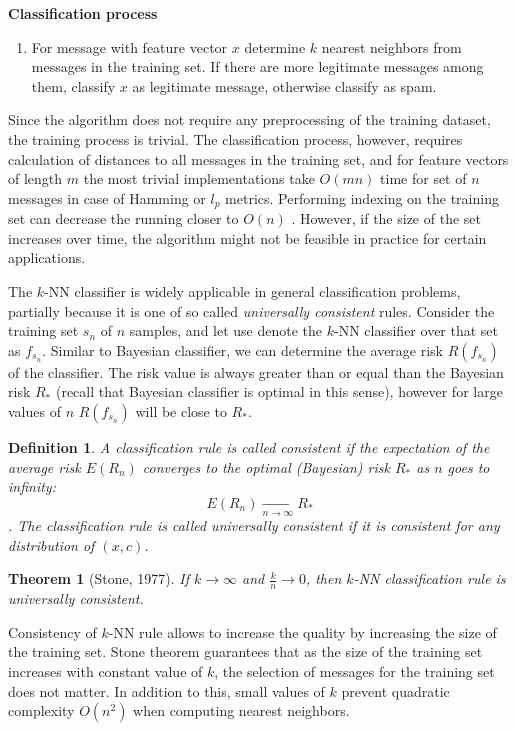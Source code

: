 \documentclass[12pt]{report}
\newtheorem{theorem}{Theorem}[section]
\newtheorem{definition}{Definition}[section]
\begin{document}
\textbf{Classification process}

\begin{enumerate}
	\item For message with feature vector $x$ determine $k$ nearest neighbors from messages in the training set. If there are more legitimate messages among them, classify $x$ as legitimate message, otherwise classify as spam.
\end{enumerate}

Since the algorithm does not require any preprocessing of the training dataset, the training process is trivial. The classification process, however, requires calculation of distances to all messages in the training set, and for feature vectors of length $m$ the most trivial implementations take $O(mn)$ time for set of $n$ messages in case of Hamming or $l_p$ metrics. Performing indexing on the training set can decrease the running closer to $O(n)$ \cite{Tretyakov}. However, if the size of the set increases over time, the algorithm might not be feasible in practice for certain applications.

The $k$-NN classifier is widely applicable in general classification problems, partially because it is one of so called \textit{universally consistent} rules. Consider the training set $s_n$ of $n$ samples, and let use denote the $k$-NN classifier over that set as $f_{s_n}$. Similar to Bayesian classifier, we can determine the average risk $R(f_{s_n})$ of the classifier. The risk value is always greater than or equal than the Bayesian risk $R_*$ (recall that Bayesian classifier is optimal in this sense), however for large values of $n$ $R(f_{s_n})$ will be close to $R_*$.

\begin{definition}
	A classification rule is called consistent if the expectation of the average risk $E(R_n)$ converges to the optimal (Bayesian) risk $R_*$ as $n$ goes to infinity:
	$$E(R_n) \xrightarrow[n \rightarrow \infty]{} R_*$$.
	The classification rule is called universally consistent if it is consistent for any distribution of $(x, c)$.
\end{definition}

\begin{theorem}[Stone, 1977]
	If $k \rightarrow \infty$ and $\frac{k}{n} \rightarrow 0$, then $k$-NN classification rule is universally consistent.
\end{theorem}

Consistency of $k$-NN rule allows to increase the quality by increasing the size of the training set. Stone theorem guarantees that as the size of the training set increases with constant value of $k$, the selection of messages for the training set does not matter. In addition to this, small values of $k$ prevent quadratic complexity $O(n^2)$ when computing nearest neighbors.
\end{document}
